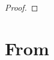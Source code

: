 \begin{solution}
\begin{proof}
	\end{proof}
%	
%	
%	

\end{solution}

\chapter{From \cite{蒋宗礼2013}}

